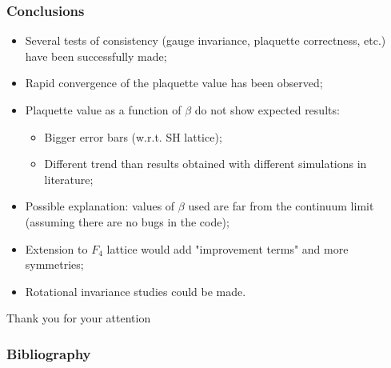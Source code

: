 \documentclass{beamer}
\begin{document}
\begin{frame}
  \frametitle{Conclusions}
  \centering
  \begin{itemize}
    \item<1->[\ding{228}] Several tests of consistency (gauge invariance, plaquette correctness, etc.) have been successfully made;
    \item<2->[\ding{228}] Rapid convergence of the plaquette value has been observed;
    \item<3->[\ding{228}] Plaquette value as a function of $\beta$ do not show expected results:
    \begin{itemize}
      \item<3-> Bigger error bars (w.r.t. SH lattice);
      \item<4-> Different trend than results obtained with different simulations in literature\cite{Celmaster:1983vy};
    \end{itemize}
    \item<5->[\ding{228}] Possible explanation: values of $\beta$ used are far from the continuum limit (assuming there are no bugs in the code);
    \item<6->[\ding{228}] Extension to $F_4$ lattice would add "improvement terms" and more symmetries;
    \item<7->[\ding{228}] Rotational invariance studies could be made.
  \end{itemize}
\end{frame}

\begin{comment}
\begin{frame}
  \frametitle{Work in Progress}
  \begin{columns}
  \column{0.5\textwidth}
\onslide<1->
    \begin{itemize}
    \item Implement the $F_4$ lattice in the simulation program and make efficiency studies;
    \vspace{5\baselineskip}
\onslide<2->
    \item Make a rotational invariance study on the new lattice, hoping to get better results than the Simple Hypercubic lattice.
    \end{itemize}
    
\onslide<1->
  \column{0.1\textwidth}
  \column{0.3\textwidth}
    \texttt{[image: F4\_root\_lattice.png]}\\
    \vspace{\baselineskip}
\onslide<2->
    \texttt{[image: plots/XY\_Plane\_nt6\_ns16\_beta2.35\_copied.png]}
  \end{columns}
\end{frame}
\end{comment}

\begin{frame}
  \centering
  \Huge
  Thank you for your attention
\end{frame}

\begin{frame}[allowframebreaks]
  \frametitle{Bibliography}
  \printbibliography
\end{frame}
\end{document}
